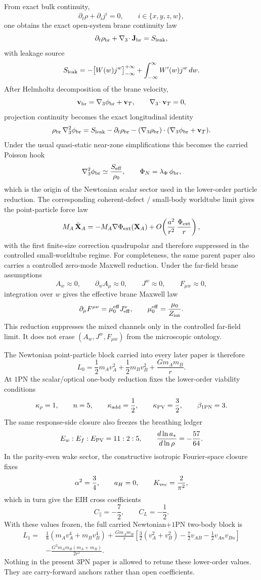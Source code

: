 \documentclass[11pt]{article}
\begin{document}
From exact bulk continuity,
\[
\partial_t\rho+\partial_i j^i=0,
\qquad i\in\{x,y,z,w\},
\]
one obtains the exact open-system brane continuity law
\[
\partial_t\rho_{\rm br}+\nabla_3\!\cdot\mathbf J_{\rm br}=S_{\rm leak},
\]
with leakage source
\[
S_{\rm leak}
=
-\bigl[W(w)j^w\bigr]_{-\infty}^{+\infty}
+
\int_{-\infty}^{\infty} W'(w)j^w\,dw.
\]
After Helmholtz decomposition of the brane velocity,
\[
\mathbf v_{\rm br}=\nabla_3\phi_{\rm br}+\mathbf v_T,
\qquad
\nabla_3\!\cdot\mathbf v_T=0,
\]
projection continuity becomes the exact longitudinal identity
\[
\rho_{\rm br}\,\nabla_3^2\phi_{\rm br}
=
S_{\rm leak}
-\partial_t\rho_{\rm br}
-(\nabla_3\rho_{\rm br})\cdot(\nabla_3\phi_{\rm br}+\mathbf v_T).
\]
Under the usual quasi-static near-zone simplifications this becomes the carried
 Poisson hook
\[
\nabla_3^2\phi_{\rm br}\simeq \frac{S_{\rm eff}}{\rho_0},
\qquad
\Phi_N=\lambda_\Phi\,\phi_{\rm br},
\]
which is the origin of the Newtonian scalar sector used in the lower-order
 particle reduction.  The corresponding coherent-defect / small-body worldtube
 limit gives the point-particle force law
\[
M_A\,\ddot{\mathbf X}_A
=
-M_A\nabla\Phi_{\rm ext}(\mathbf X_A)
+O\!\left(\frac{a^2}{r^2}\,\frac{\Phi_{\rm ext}}{r}\right),
\]
with the first finite-size correction quadrupolar and therefore suppressed in the
 controlled small-worldtube regime.  For completeness, the same parent paper also
 carries a controlled zero-mode Maxwell reduction.  Under the far-field brane
 assumptions
\[
A_w\approx 0,
\qquad
\partial_w A_\mu\approx 0,
\qquad
J^w\approx 0,
\qquad
F_{\mu w}\approx 0,
\]
integration over $w$ gives the effective brane Maxwell law
\[
\partial_\mu F^{\mu\nu}=\mu_0^{\rm eff}J_{\rm eff}^\nu,
\qquad
\mu_0^{\rm eff}=\frac{\mu_0}{Z_{\rm int}}.
\]
This reduction suppresses the mixed channels only in the controlled far-field
 limit.  It does not erase $(A_w,J^w,F_{\mu w})$ from the microscopic ontology.

The Newtonian point-particle block carried into every later paper is therefore
\[
L_0
=
\frac12 m_A v_A^2
+\frac12 m_B v_B^2
+\frac{Gm_A m_B}{r}.
\]
At $1$PN the scalar/optical one-body reduction fixes the lower-order viability
 conditions
\[
\kappa_\rho=1,
\qquad
n=5,
\qquad
\kappa_{\rm add}=\frac12,
\qquad
\kappa_{\rm PV}=\frac32,
\qquad
\beta_{\rm 1PN}=3.
\]
The same response-side closure also freezes the breathing ledger
\[
E_w:E_f:E_{\rm PV}=11:2:5,
\qquad
\frac{d\ln a_*}{d\ln\rho}=-\frac{57}{64}.
\]
In the parity-even wake sector, the constructive isotropic Fourier-space closure
 fixes
\[
\alpha^2=\frac34,
\qquad
a_H=0,
\qquad
K_{\rm vec}=\frac{2}{\pi^2},
\]
which in turn give the EIH cross coefficients
\[
C_\parallel=-\frac72,
\qquad
C_L=-\frac12.
\]
With these values frozen, the full carried Newtonian+$1$PN two-body block is
\[
\begin{aligned}
L_1=
&\frac18(m_Av_A^4+m_Bv_B^4)
+\frac{Gm_A m_B}{r}
\left[
\frac32(v_A^2+v_B^2)
-\frac72 v_{AB}
-\frac12 v_{An}v_{Bn}
\right]
\\
&-\frac{G^2m_A m_B(m_A+m_B)}{2r^2}.
\end{aligned}
\]
Nothing in the present $3$PN paper is allowed to retune these lower-order values.
 They are carry-forward anchors rather than open coefficients.
\end{document}
